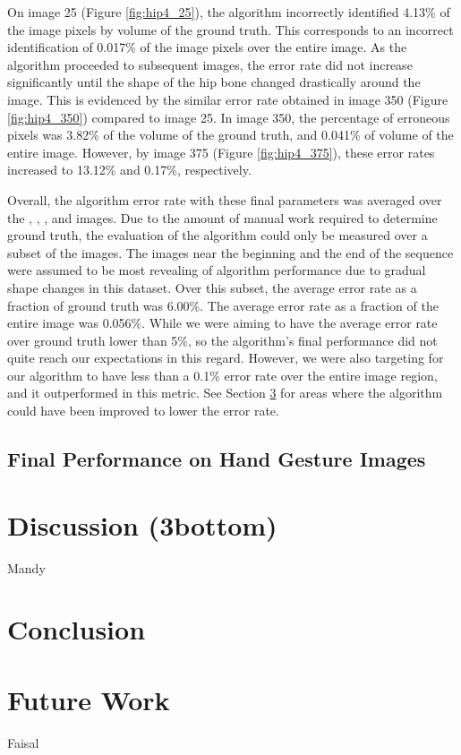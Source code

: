 \documentclass{article}
\begin{document}
		On image 25 (Figure \ref{fig:hip4_25}), the algorithm incorrectly identified 4.13\% of the image pixels by volume of the ground truth. This corresponds to an incorrect identification of 0.017\% of the image pixels over the entire image. As the algorithm proceeded to subsequent images, the error rate did not increase significantly until the shape of the hip bone changed drastically around the  image. This is evidenced by the similar error rate obtained in image 350 (Figure \ref{fig:hip4_350}) compared to image 25. In image 350, the percentage of erroneous pixels was 3.82\% of the volume of the ground truth, and 0.041\% of volume of the entire image. However, by image 375 (Figure \ref{fig:hip4_375}), these error rates increased to 13.12\% and 0.17\%, respectively.

		Overall, the algorithm error rate with these final parameters was averaged over the , , , and  images. Due to the amount of manual work required to determine ground truth, the evaluation of the algorithm could only be measured over a subset of the images. The images near the beginning and the end of the sequence were assumed to be most revealing of algorithm performance due to gradual shape changes in this dataset. Over this subset, the average error rate as a fraction of ground truth was 6.00\%. The average error rate as a fraction of the entire image was 0.056\%. While we were aiming to have the average error rate over ground truth lower than 5\%, so the algorithm's final performance did not quite reach our expectations in this regard. However, we were also targeting for our algorithm to have less than a 0.1\% error rate over the entire image region, and it outperformed in this metric. See Section \ref{sec:futurework} for areas where the algorithm could have been improved to lower the error rate.
		
		\subsection{Final Performance on Hand Gesture Images}
	\section{Discussion (3bottom)}
		Mandy

	\section{Conclusion}
	\section{Future Work} \label{sec:futurework}
		Faisal
	\nocite{*}
	
	
	
\end{document}
